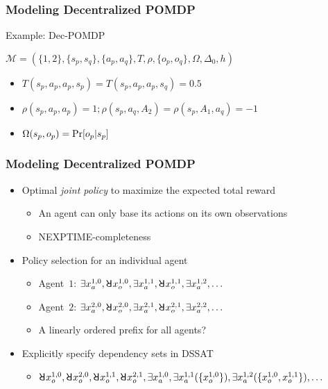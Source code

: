 \begin{frame}
    \frametitle{Modeling Decentralized POMDP}
    \begin{block}{Example: Dec-POMDP}
        \begin{figure}
            \centering
            
        \end{figure}
        $\mathcal{M}=(\{1,2\},\{s_p,s_q\},\{a_p,a_q\},T,\rho,\{o_p,o_q\},\Omega,\Delta_0,h)$
        \begin{itemize}
            \item $T(s_p,a_p,a_p,s_p)=T(s_p,a_p,a_p,s_q)=0.5$
            \item $\rho(s_p,a_p,a_p)=1;\rho(s_p,a_q,A_2)=\rho(s_p,A_1,a_q)=-1$
            \item $\Omega(s_p,o_p)=\Pr[o_p|s_p]$
        \end{itemize}
    \end{block}
\end{frame}

\begin{frame}
    \frametitle{Modeling Decentralized POMDP}
    \begin{itemize}
        \item Optimal \emph{joint policy} to maximize the expected total reward
              \begin{itemize}
                  \item An agent can only base its actions on \alert{its own observations}
                  \item NEXPTIME-completeness~\cite{Bernstein2002}
              \end{itemize}
              \pause
        \item Policy selection for an individual agent~\cite{Salmon2020}
              \begin{itemize}
                  \item Agent~$1$: $\exists x_a^{1,0},\random{} x_o^{1,0},\exists x_a^{1,1},\random{} x_o^{1,1},\exists x_a^{1,2},\ldots$
                  \item Agent~$2$: $\exists x_a^{2,0},\random{} x_o^{2,0},\exists x_a^{2,1},\random{} x_o^{2,1},\exists x_a^{2,2},\ldots$
                  \item A linearly ordered prefix for all agents?
              \end{itemize}
              \pause
        \item Explicitly specify dependency sets in DSSAT
              \begin{itemize}
                  \item $\random{}x_o^{1,0},\random{}x_o^{2,0},\random{}x_o^{1,1},\random{}x_o^{2,1},\exists x_a^{1,0},\exists x_a^{1,1}(\{x_o^{1,0}\}),\exists x_a^{1,2}(\{x_o^{1,0},x_o^{1,1}\}),\ldots$
              \end{itemize}
    \end{itemize}
\end{frame}